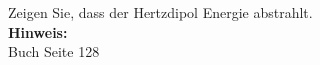 \begin{question}[section=5,subsection=51,name={Hertzdipol},difficulty=10,type=mdl,mode=exm,tags={}]
	Zeigen Sie, dass der Hertzdipol Energie abstrahlt.
	\\ \textbf{Hinweis:}\\
	Buch Seite 128
\end{question}
\begin{solution}
	
\end{solution}
